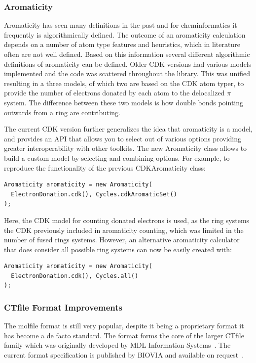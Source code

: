 \documentclass[10pt]{bmcart}
\begin{document}
  \subsubsection*{Aromaticity}

  Aromaticity has seen many definitions in the past and for cheminformatics it
  frequently is algorithmically defined. The outcome of an aromaticity calculation
  depends on a number of atom type features and heuristics, which in literature
  often are not well defined. Based on this information several different
  algorithmic definitions of aromaticity can be defined. Older CDK versions had
  various models implemented and the code was scattered throughout the library.
  This was unified resulting in a three models, of which two are based on the
  CDK atom typer, to provide the number of electrons donated by each atom to
  the delocalized $\pi$ system. The difference between these two models is
  how double bonds pointing outwards from a ring are contributing.

  The current CDK version further generalizes the idea that aromaticity is a
  model, and provides an API that allows you to select out of various options
  providing greater interoperability with other toolkits. The new
  Aromaticity class allows to build a custom model by selecting and combining
  options. For example, to reproduce the functionality of the previous
  CDKAromaticity class:

\begin{verbatim}
Aromaticity aromaticity = new Aromaticity(
  ElectronDonation.cdk(), Cycles.cdkAromaticSet()
);
\end{verbatim}

Here, the CDK model for counting donated electrons is used, as the ring systems
the CDK previously included in aromaticity counting, which was limited in the 
number of fused rings systems. However, an alternative aromaticity calculator
that does consider all possible ring systems can now be easily created with:

\begin{verbatim}
Aromaticity aromaticity = new Aromaticity(
  ElectronDonation.cdk(), Cycles.all()
);
\end{verbatim}

\subsubsection*{CTfile Format Improvements}

The molfile format is still very popular, despite it being a proprietary
format it has become a de facto standard. The format forms the core of the larger
CTfile family which was originally developed by MDL Information Systems~\cite{Dalby92}. The
current format specification is published by BIOVIA and available on 
request~\cite{ctfilespec}.
 
\end{document}
